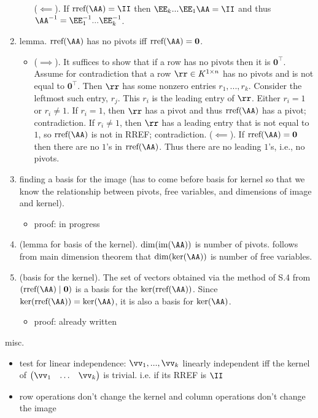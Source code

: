 \begin{enumerate}
\begin{itemize}
        ($\impliedby$). If $\rref(\AA) = \II$ then $\EE_k ... \EE_1 \AA = \II$ and thus $\AA^{-1} = \EE_1^{-1} ... \EE_k^{-1}$.
    \end{itemize}
    \item lemma. $\rref(\AA)$ has no pivots iff $\rref(\AA) = \mathbf{0}$.
    \begin{itemize}
        \item ($\implies$). It suffices to show that if a row has no pivots then it is $\mathbf{0}^\top$. Assume for contradiction that a row $\rr \in K^{1 \times n}$ has no pivots and is not equal to $\mathbf{0}^\top$. Then $\rr$ has some nonzero entries $r_1, ..., r_k$. Consider the leftmost such entry, $r_j$. This $r_i$ is the leading entry of $\rr$. Either $r_i = 1$ or $r_i \neq 1$. If $r_i = 1$, then $\rr$ has a pivot and thus $\rref(\AA)$ has a pivot; contradiction. If $r_i \neq 1$, then $\rr$ has a leading entry that is not equal to $1$, so $\rref(\AA)$ is not in RREF; contradiction. 
        ($\impliedby$). If $\rref(\AA) = \mathbf{0}$ then there are no $1$'s in $\rref(\AA)$. Thus there are no leading $1$'s, i.e., no pivots.
    \end{itemize}
    \item finding a basis for the image (has to come before basis for kernel so that we know the relationship between pivots, free variables, and dimensions of image and kernel).
    \begin{itemize}
        \item proof: in progress
    \end{itemize}
    \item (lemma for basis of the kernel). $\dim(\im(\AA))$ is number of pivots. follows from main dimension theorem that $\dim(\ker(\AA))$ is number of free variables.
    \item (basis for the kernel). The set of vectors obtained via the method of S.4 from $(\rref(\AA) \mid \mathbf{0})$ is a basis for the $\ker(\rref(\AA))$. Since $\ker(\rref(\AA)) = \ker(\AA)$, it is also a basis for $\ker(\AA)$.
    \begin{itemize}
        \item proof: already written
    \end{itemize}
\end{enumerate}

misc.
\begin{itemize}
    \item test for linear independence: $\vv_1, ..., \vv_k$ linearly independent iff the kernel of $\begin{pmatrix} \vv_1 & \hdots & \vv_k \end{pmatrix}$ is trivial. i.e. if its RREF is $\II$
    \item row operations don't change the kernel and column operations don't change the image
\end{itemize}

